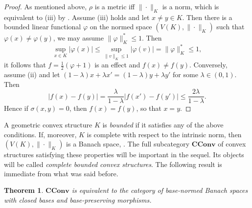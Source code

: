 \documentclass[12pt]{article}
\newtheorem{thm}{Theorem}
\newcommand{\<}{\langle}
\theoremstyle{remark}
\newcommand{\ct}[1]{\mathbf{#1}}
\begin{document}
\begin{proof} As mentioned above, $\rho$ is a metric iff $\|\cdot\|_K$ is a norm, which is equivalent to (iii) by \cite{ellis}. Assume (iii) holds and let $x\ne y\in K$. Then there is a bounded linear functional $\varphi$ on the normed space $(V(K),\|\cdot\|_K)$ 
such that $\varphi(x)\ne \varphi(y)$, we may assume $\|\varphi\|_K^*\le 1$. Then 
\[
\sup_{x\in K} |\varphi(x)|\le \sup_{\|v\|_K\le 1} |\varphi(v)|=\|\varphi\|_K^*\le 1,
\]
it follows that $f=\frac12(\varphi+1)$ is an effect and $f(x)\ne f(y)$. 
Conversely, assume (ii) and let $(1-\lambda)x+\lambda x'=(1-\lambda)y+\lambda y'$ for some $\lambda\in (0,1)$. Then
\[
|f(x)-f(y)|=\frac{\lambda}{1-\lambda}|f(x')-f(y')|\le \frac{2\lambda}{1-\lambda}.
\]
Hence if $\sigma(x,y)=0$, then $f(x)=f(y)$, so that  $x=y$.


\end{proof}
 
 A geometric convex structure $K$ is  \emph{bounded} if it satisfies any of  the above conditions. If, moreover,  $K$ is complete with respect to the intrinsic norm, then $(V(K),\|\cdot\|_K)$ is a Banach space, \cite{gudder}. The full subcategory $\ct{CConv}$ of 
  convex structures satisfying these properties will be important in the sequel. Its objects will be called \emph{complete bounded convex structures}. 
The following result is immediate from what was said before.

\begin{thm} 
$\ct{CConv}$ is equivalent to the category of base-normed Banach spaces with closed bases and base-preserving morphisms.
\end{thm}
\end{document}

